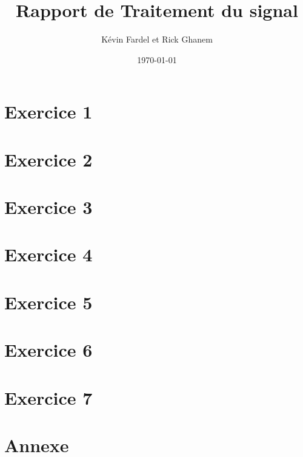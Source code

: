 \documentclass[a4paper, 11pt]{article}           %
\author{Kévin Fardel et Rick Ghanem}
\date{\today}
\title{Rapport de Traitement du signal}
\begin{document}

\maketitle %

\begin{abstract}
\end{abstract}

\tableofcontents %

\lstlistoflistings %

\newpage
\part{Exercice 1}

\part{Exercice 2}

\part{Exercice 3}

\part{Exercice 4}

\part{Exercice 5}

\part{Exercice 6}

\part{Exercice 7}

\part{Annexe}

\end{document}
